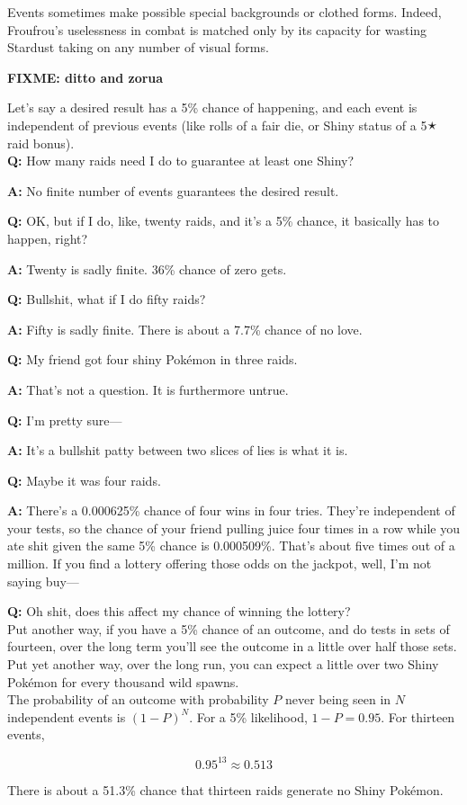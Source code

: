 Events sometimes make possible special backgrounds or clothed forms.
Indeed, Froufrou's uselessness in combat is matched only by its
  capacity for wasting Stardust taking on any number of visual forms.

\textbf{FIXME: ditto and zorua}

\begin{tcolorbox}[enhanced,title=An aside regarding independent events,halign title=flush center]
Let's say a desired result has a 5\% chance of happening, and each event is independent of previous events (like rolls of a fair die, or Shiny status of a 5🟉 raid bonus).\\

\textbf{Q:} How many raids need I do to guarantee at least one Shiny?

\textbf{A:} No finite number of events guarantees the desired result.

\textbf{Q:} OK, but if I do, like, twenty raids, and it's a 5\% chance, it basically has to happen, right?

\textbf{A:} Twenty is sadly finite. 36\% chance of zero gets.

\textbf{Q:} Bullshit, what if I do fifty raids?

\textbf{A:} Fifty is sadly finite. There is about a 7.7\% chance of no love.

\textbf{Q:} My friend got four shiny Pokémon in three raids.

\textbf{A:} That's not a question. It is furthermore untrue.

\textbf{Q:} I'm pretty sure---

\textbf{A:} It's a bullshit patty between two slices of lies is what it is.

\textbf{Q:} Maybe it was four raids.

\textbf{A:} There's a 0.000625\% chance of four wins in four tries. They're independent of your tests,
             so the chance of your friend pulling juice four times in a row while you ate shit given
             the same 5\% chance is 0.000509\%. That's about five times out of a million.
             If you find a lottery offering those odds on the jackpot, well, I'm not saying buy---

\textbf{Q:} Oh shit, does this affect my chance of winning the lottery?\\

Put another way, if you have a 5\% chance of an outcome, and do tests in sets of fourteen,
 over the long term you'll see the outcome in a little over half those sets.
Put yet another way, over the long run, you can expect a little over two Shiny
 Pokémon for every thousand wild spawns.\\

The probability of an outcome with probability $P$ never being seen in $N$ independent
  events is ${(1 - P)}^N$. For a 5\% likelihood, $1 - P = 0.95$. For thirteen events,

  \[ 0.95^{13} ≈ 0.513 \]

There is about a 51.3\% chance that thirteen raids generate no Shiny Pokémon.
\end{tcolorbox}
